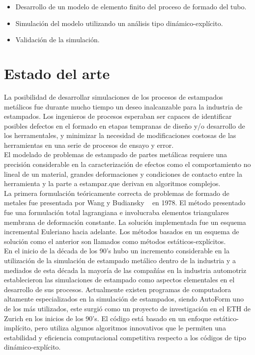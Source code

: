 \begin{itemize}
\item Desarrollo de un modelo de elemento finito del proceso de formado del tubo.
\item Simulación del modelo utilizando un análisis tipo dinámico-explícito.
\item Validación de la simulación.
\end{itemize}


\section{Estado del arte}

La posibilidad de desarrollar simulaciones de los procesos de estampados metálicos fue durante mucho tiempo 
un deseo inalcanzable para la industria de estampados. Los ingenieros de procesos esperaban ser capaces de 
identificar posibles defectos en el formado en etapas tempranas de diseño y/o desarrollo de los herramentales, 
y minimizar la necesidad de modificaciones costosas de las herramientas en una serie de procesos de ensayo y error. \\

El modelado de problemas de estampado de partes metálicas requiere una precisión considerable en la caracterización 
de efectos como el comportamiento no lineal de un material, grandes deformaciones y condiciones de contacto entre la
herramienta y la parte a estampar.que derivan  en algoritmos complejos.\cite{banabic2000}\\

La primera formulación teóricamente correcta de problemas de formado de metales fue presentada por 
Wang y Budiansky ~\cite{wang1978} en 1978. El método presentado fue una formulación total lagrangiana 
e involucraba elementos triangulares membrana de deformación constante. La solución implementada fue 
un esquema incremental Euleriano hacia adelante. Los métodos basados en un 
esquema de solución como el anterior son llamados como métodos estáticos-explícitos.\\

En el inicio de la década de los 90's hubo un incremento considerable en la utilización de la simulación de estampado 
metálico dentro de la industria y a mediados de esta década la mayoría de las compañías en la industria automotriz 
establecieron las simulaciones de estampado como aspectos elementales en el desarrollo de sus procesos. 
Actualmente existen programas de computadora altamente especializados en la simulación de estampados, siendo AutoForm 
uno de los más utilizados, este surgió como un proyecto de investigación en el ETH de Zurich en los inicios de los 90's. 
El código está basado en un enfoque estático-implícito, pero utiliza algunos algoritmos innovativos que le permiten 
una estabilidad y eficiencia computacional competitiva respecto a los códigos de tipo dinámico-explícito.  ~\cite{banabic2000}\\

